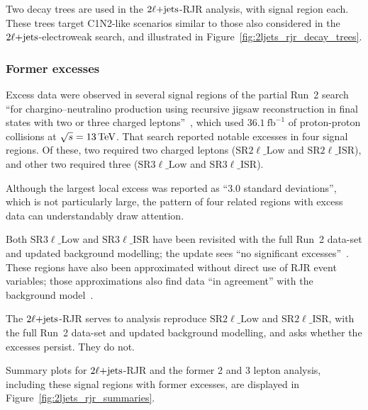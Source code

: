 Two decay trees are used in the $\twoljets$-RJR analysis, with signal region
each.
These trees target C1N2-like scenarios similar to those also considered in the
$\twoljets$-electroweak search,
and illustrated in Figure~\ref{fig:2ljets_rjr_decay_trees}.

\subsubsection{Former excesses}
Excess data were observed in several signal regions of the partial Run~2
search ``for chargino--neutralino production using recursive
jigsaw reconstruction in final states with two or three charged
leptons''~\cite{atlas_rjr_23l_SUSY_2017_03},
which used $36.1~\mathrm{fb}^{-1}$ of proton-proton collisions at
$\sqrt{s} = 13\,\eV[T]$.
That search reported notable excesses in four signal regions.
Of these, two required two charged leptons
($\mathrm{SR}2\ell\_\mathrm{Low}$ and $\mathrm{SR}2\ell\_\mathrm{ISR}$),
and other two required three
($\mathrm{SR}3\ell\_\mathrm{Low}$ and $\mathrm{SR}3\ell\_\mathrm{ISR}$).

Although the largest local excess was reported as ``$3.0$ standard deviations'',
which is not particularly large, the pattern of four related regions with
excess data can understandably draw attention.

Both $\mathrm{SR}3\ell\_\mathrm{Low}$ and $\mathrm{SR}3\ell\_\mathrm{ISR}$
have been revisited with the full Run~2 data-set and updated background
modelling;
the update sees ``no significant excesses''~\cite{atlas_rjr_3l_SUSY_2019_09}.
These regions have also been approximated without direct use of RJR event
variables;
those approximations also find data ``in agreement'' with the background
model~\cite{atlas_rjr_mimic_SUSY_2018_06}.

The $\twoljets$-RJR serves to analysis reproduce
$\mathrm{SR}2\ell\_\mathrm{Low}$ and $\mathrm{SR}2\ell\_\mathrm{ISR}$,
with the full Run~2 data-set and updated background modelling,
and asks whether the excesses persist.
They do not.

Summary plots for $\twoljets$-RJR and the former 2 and 3 lepton analysis,
including these signal regions with former excesses,
are displayed in Figure~\ref{fig:2ljets_rjr_summaries}.

